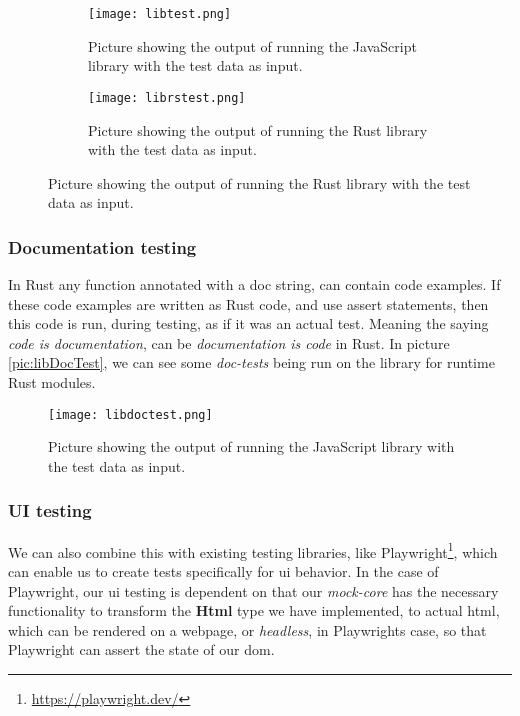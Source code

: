 \begin{figure}[H]
  \begin{subfigure}[h]{0.49\linewidth}
    \centering
    \texttt{[image: libtest.png]}
    \caption{
      Picture showing the output of running the JavaScript library with the test
      data as input.
    }
    \label{pic:libTest}
  \end{subfigure}
  \hfill
  \begin{subfigure}[h]{0.49\linewidth}
    \centering
    \texttt{[image: librstest.png]}
    \caption{
      Picture showing the output of running the Rust library with the test
      data as input.
    }
    \label{pic:libRsTest}
  \end{subfigure}
\end{figure}


\subsubsection{Documentation testing}

In Rust any function annotated with a doc string, can contain code examples. If
these code examples are written as Rust code, and use assert statements, then
this code is run, during testing, as if it was an actual test. Meaning the
saying \textit{code is documentation}, can be \textit{documentation is code} in
Rust. In picture \ref{pic:libDocTest}, we can see some \textit{doc-tests} being
run on the library for runtime Rust modules.

\begin{figure}
  \centering
  \texttt{[image: libdoctest.png]}
  \caption{
    Picture showing the output of running the JavaScript library with the test
    data as input.
  }
  \label{pic:libTest}
\end{figure}




\subsubsection{UI testing}

We can also combine this with existing testing libraries, like Playwright\footnote{\url{https://playwright.dev/}},
which can enable us to create tests specifically for \gls*{ui} behavior. In the
case of Playwright, our \gls*{ui} testing is dependent on that our
\textit{mock-core} has the necessary functionality to transform the
\textbf{Html} type we have implemented, to actual \gls*{html}, which can be
rendered on a webpage, or \textit{headless}, in Playwrights case, so that
Playwright can assert the state of our \gls*{dom}.


